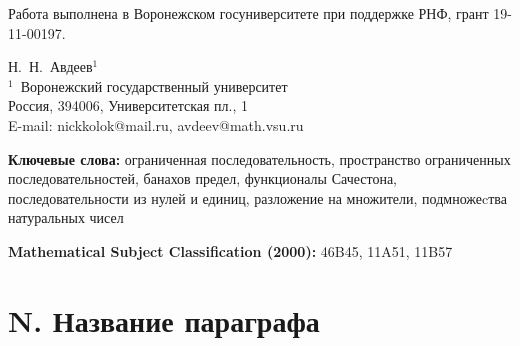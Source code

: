 

\Russian

 \def\endpage{??}




 \let\thefootnote\relax\setcounter{section}{0}\setcounter{equation}{0}


 \DOI{ } %





 \begin{center}
	Работа выполнена в Воронежском госуниверситете при поддержке РНФ, грант 19-11-00197.
 \end{center}


 \begin{center}
 {Н.~Н.~Авдеев$^{1}$\\[4pt]}
 {\rm\footnotesize{$^1$\,
 Воронежский государственный университет\\
 Россия, 394006, Университетская пл., 1\\
 E-mail: nickkolok@mail.ru, avdeev@math.vsu.ru}}
 \end{center}


 \Abstract{
 
 
 } %

 {\noindent\footnotesize{\bf Ключевые слова:}
	ограниченная последовательность,
	пространство ограниченных последовательностей,
	банахов предел,
	функционалы Сачестона,
	последовательности из нулей и единиц,
	разложение на множители,
	подмножеcтва натуральных чисел
 \par} %

 \smallskip

 {\noindent\footnotesize {\bf Mathematical Subject Classification (2000):}
	46B45,
	11A51,
	11B57
	\par} %








 \section{N. Название параграфа}


